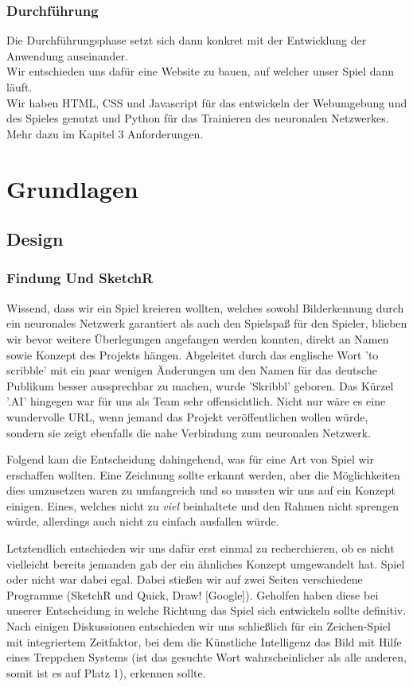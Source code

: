 \documentclass[11pt]{article}
\begin{document}
\subsubsection{ Durchführung }
Die Durchführungsphase setzt sich dann konkret mit der 					Entwicklung der Anwendung auseinander.\\
Wir entschieden uns dafür eine Website zu bauen, auf welcher 			unser Spiel dann läuft.\\
Wir haben HTML, CSS und Javascript für das entwickeln der 			Webumgebung und des Spieles genutzt und Python für das 				Trainieren des neuronalen Netzwerkes.\\
Mehr dazu im Kapitel 3 Anforderungen.

\section{Grundlagen}
\subsection{Design}
\subsubsection{Findung Und SketchR}

Wissend, dass wir ein Spiel kreieren wollten, welches sowohl Bilderkennung durch ein neuronales Netzwerk garantiert als auch den Spielspaß für den Spieler, blieben wir bevor weitere Überlegungen angefangen werden konnten, direkt an Namen sowie Konzept des Projekts hängen. 
Abgeleitet durch das englische Wort 'to scribble' mit ein paar wenigen Änderungen um den Namen für das deutsche Publikum besser aussprechbar zu machen, wurde 'Skribbl' geboren. Das Kürzel '.AI' hingegen war für uns als Team sehr offensichtlich. Nicht nur wäre es eine wundervolle URL, wenn jemand das Projekt veröffentlichen wollen würde, sondern sie zeigt ebenfalls die nahe Verbindung zum neuronalen Netzwerk.

Folgend kam die Entscheidung dahingehend, was für eine Art von Spiel wir erschaffen wollten. Eine Zeichnung sollte erkannt werden, aber die Möglichkeiten dies umzusetzen waren zu umfangreich und so mussten wir uns auf ein Konzept einigen. Eines, welches nicht zu \textit{viel} beinhaltete und den Rahmen nicht sprengen würde, allerdings auch nicht zu einfach ausfallen würde. 

Letztendlich entschieden wir uns dafür erst einmal zu recherchieren, ob es nicht vielleicht bereits jemanden gab der ein ähnliches Konzept umgewandelt hat. Spiel oder nicht war dabei egal. 
Dabei stießen wir auf zwei Seiten verschiedene Programme (SketchR und Quick, Draw! [Google]). Geholfen haben diese bei unserer Entscheidung in welche Richtung das Spiel sich entwickeln sollte definitiv. Nach einigen Diskussionen entschieden wir uns schließlich für ein Zeichen-Spiel mit integriertem Zeitfaktor, bei dem die Künstliche Intelligenz das Bild mit Hilfe eines Treppchen Systems (ist das gesuchte Wort wahrscheinlicher als alle anderen, somit ist es auf Platz 1), erkennen sollte. 
\end{document}
